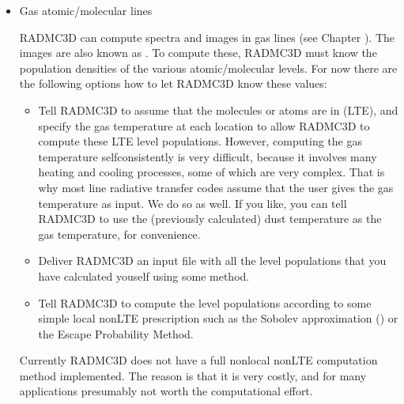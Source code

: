 \documentclass[letterpaper,10pt,english]{sphinxmanual}
\begin{document}
\begin{itemize}
\item {} 
Gas atomic/molecular lines

RADMC\sphinxhyphen{}3D can compute spectra and images in gas lines (see Chapter
{\hyperref[\detokenize{lineradtrans:chap-line-transfer}]{}}). The images are also known as . To
compute these, RADMC\sphinxhyphen{}3D must know the population densities of the various
atomic/molecular levels. For now there are the following options how to let
RADMC\sphinxhyphen{}3D know these values:
\begin{itemize}
\item {} 
Tell RADMC\sphinxhyphen{}3D to assume that the molecules or atoms are in  (LTE), and specify the gas temperature at
each location to allow RADMC\sphinxhyphen{}3D to compute these LTE level populations.
 However, computing the gas
temperature self\sphinxhyphen{}consistently is very difficult, because it involves
many heating and cooling processes, some of which are very complex.
That is why most line radiative transfer codes assume that the user gives
the gas temperature as input. We do so as well. If you like, you can
tell RADMC\sphinxhyphen{}3D to use the (previously calculated) dust temperature as the
gas temperature, for convenience.

\item {} 
Deliver RADMC\sphinxhyphen{}3D an input file with all the level populations
that you have calculated youself using some method.

\item {} 
Tell RADMC\sphinxhyphen{}3D to compute the level populations according to some
simple local non\sphinxhyphen{}LTE prescription such as the Sobolev approximation
() or the Escape Probability Method.

\end{itemize}

Currently RADMC\sphinxhyphen{}3D does not have a full non\sphinxhyphen{}local non\sphinxhyphen{}LTE computation
method implemented. The reason is that it is very costly, and for many
applications presumably not worth the computational effort.

\end{itemize}
\end{document}
